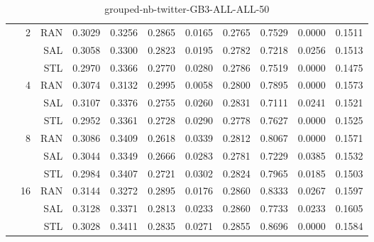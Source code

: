 \begin{center}
\begin{table}[htbp]
\begin{center}
\begin{tabular}{ | r | r | r | r | r | r | r | r | r | r | r |}
 & \multirow{3}{*}{2} & RAN & 0.3029 & 0.3256 & 0.2865 & 0.0165 & 0.2765 & 0.7529 & 0.0000 & 0.1511\\ \cline{3-11}
 &   & SAL & 0.3058 & 0.3300 & 0.2823 & 0.0195 & 0.2782 & 0.7218 & 0.0256 & 0.1513\\ \cline{3-11}
 &   & STL & 0.2970 & 0.3366 & 0.2770 & 0.0280 & 0.2786 & 0.7519 & 0.0000 & 0.1475\\ \cline{2-11}
 & \multirow{3}{*}{4} & RAN & 0.3074 & 0.3132 & 0.2995 & 0.0058 & 0.2800 & 0.7895 & 0.0000 & 0.1573\\ \cline{3-11}
 &   & SAL & 0.3107 & 0.3376 & 0.2755 & 0.0260 & 0.2831 & 0.7111 & 0.0241 & 0.1521\\ \cline{3-11}
 &   & STL & 0.2952 & 0.3361 & 0.2728 & 0.0290 & 0.2778 & 0.7627 & 0.0000 & 0.1525\\ \cline{2-11}
 & \multirow{3}{*}{8} & RAN & 0.3086 & 0.3409 & 0.2618 & 0.0339 & 0.2812 & 0.8067 & 0.0000 & 0.1571\\ \cline{3-11}
 &   & SAL & 0.3044 & 0.3349 & 0.2666 & 0.0283 & 0.2781 & 0.7229 & 0.0385 & 0.1532\\ \cline{3-11}
 &   & STL & 0.2984 & 0.3407 & 0.2721 & 0.0302 & 0.2824 & 0.7965 & 0.0185 & 0.1503\\ \cline{2-11}
 & \multirow{3}{*}{16} & RAN & 0.3144 & 0.3272 & 0.2895 & 0.0176 & 0.2860 & 0.8333 & 0.0267 & 0.1597\\ \cline{3-11}
 &   & SAL & 0.3128 & 0.3371 & 0.2813 & 0.0233 & 0.2860 & 0.7733 & 0.0233 & 0.1605\\ \cline{3-11}
 &   & STL & 0.3028 & 0.3411 & 0.2835 & 0.0271 & 0.2855 & 0.8696 & 0.0000 & 0.1584\\ \cline{2-11}
\hline
\end{tabular}
\caption{grouped-nb-twitter-GB3-ALL-ALL-50}
\end{center}
 \end{table}
\end{center}

